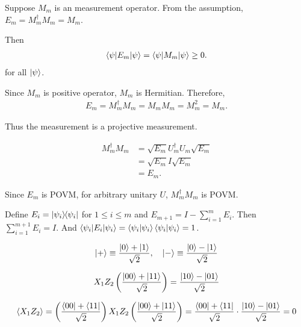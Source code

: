 
Suppose $M_m$ is an measurement operator.
From the assumption, $E_m = M_m^\dagger M_m = M_m$.

Then
\begin{align*}
    \braket{\psi | E_m | \psi} = \braket{\psi | M_m | \psi} \geq 0.
\end{align*}
for all $\ket{\psi}$.

Since $M_m$ is positive operator, $M_m$ is Hermitian.
Therefore,
\begin{align*}
    E_m = M_m^\dagger M_m = M_m M_m = M_m^2 = M_m.
\end{align*}

Thus the measurement is a projective measurement.



\begin{align*}
    M_m^\dagger M_m &= \sqrt{E_m} U_m^\dagger U_m \sqrt{E_m}\\
        &= \sqrt{E_m} I \sqrt{E_m}\\
        &= E_m.
\end{align*}

Since $E_m$ is POVM,  for arbitrary  unitary $U$, $M_m^\dagger M_m$ is POVM.




Define $E_i = \ket{\psi_i}\hspace{-1mm} \bra{\psi_i}$ for $1 \leq i \leq m$ and $E_{m+1} = I - \sum_{i=1}^{m} E_i$. Then $\sum_{i=1}^{m+1} E_i = I$.
And $\braket{\psi_i | E_i | \psi_i} = \braket{\psi_i | \psi_i} \braket{\psi_i | \psi_i} = 1$.



\begin{align*}
    \ket{+} \equiv \frac{\ket{0} + \ket{1}}{\sqrt{2}}, ~~~ \ket{-} \equiv \frac{\ket{0} - \ket{1}}{\sqrt{2}}
\end{align*}


\begin{align*}
     X_1 Z_2 \left(\frac{\ket{00} + \ket{11}}{\sqrt{2}} \right) = \frac{\ket{10} - \ket{01}}{\sqrt{2}}
\end{align*}


\begin{align*}
     \braket{X_1 Z_2} = \left(\frac{\bra{00} + \bra{11}}{\sqrt{2}} \right) X_1 Z_2 \left(\frac{\ket{00} + \ket{11}}{\sqrt{2}} \right)
    = \frac{\bra{00} + \bra{11}}{\sqrt{2}}  \cdot \frac{\ket{10} - \ket{01}}{\sqrt{2}}
    = 0
\end{align*}



